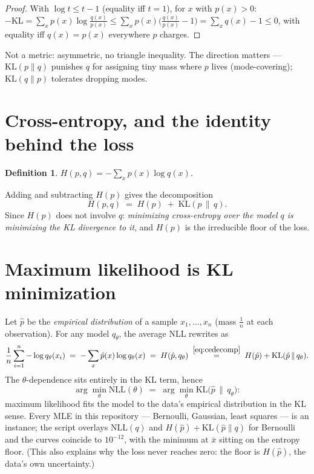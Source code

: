 \documentclass[11pt]{article}
\newtheorem{definition}{Definition}
\begin{document}
\begin{proof}
With $\log t \le t - 1$ (equality iff $t=1$), for $x$ with $p(x)>0$:
$-\mathrm{KL} = \sum_x p(x)\log\frac{q(x)}{p(x)} \le
\sum_x p(x)\bigl(\frac{q(x)}{p(x)} - 1\bigr) = \sum_x q(x) - 1 \le 0$,
with equality iff $q(x)=p(x)$ everywhere $p$ charges.
\end{proof}

Not a metric: asymmetric, no triangle inequality. The direction matters
--- $\mathrm{KL}(p\|q)$ punishes $q$ for assigning tiny mass where $p$
lives (mode-covering); $\mathrm{KL}(q\|p)$ tolerates dropping modes.

\section{Cross-entropy, and the identity behind the loss}

\begin{definition}
$H(p, q) = -\sum_x p(x)\log q(x)$.
\end{definition}

Adding and subtracting $H(p)$ gives the decomposition
\begin{equation}
  \boxed{\;H(p, q) \;=\; H(p) \;+\; \mathrm{KL}(p\,\|\,q).\;}
  \label{eq:cedecomp}
\end{equation}
Since $H(p)$ does not involve $q$: \emph{minimizing cross-entropy over the
model $q$ is minimizing the KL divergence to it}, and $H(p)$ is the
irreducible floor of the loss.

\section{Maximum likelihood is KL minimization}

Let $\hat p$ be the \emph{empirical distribution} of a sample
$x_1,\dots,x_n$ (mass $\tfrac1n$ at each observation). For any model
$q_\theta$, the average NLL rewrites as
\begin{equation}
  \frac1n \sum_{i=1}^n -\log q_\theta(x_i)
  \;=\; -\sum_x \hat p(x) \log q_\theta(x)
  \;=\; H(\hat p, q_\theta)
  \;\overset{\eqref{eq:cedecomp}}{=}\;
  H(\hat p) + \mathrm{KL}(\hat p \,\|\, q_\theta) .
  \label{eq:mlekl}
\end{equation}
The $\theta$-dependence sits entirely in the KL term, hence
\begin{equation}
  \boxed{\;\arg\min_\theta \mathrm{NLL}(\theta)
  \;=\; \arg\min_\theta \mathrm{KL}\bigl(\hat p \,\|\, q_\theta\bigr):\;}
  \label{eq:mleiskl}
\end{equation}
maximum likelihood fits the model to the data's empirical distribution in
the KL sense. Every MLE in this repository --- Bernoulli, Gaussian, least
squares --- is an instance; the script overlays $\mathrm{NLL}(q)$ and
$H(\hat p) + \mathrm{KL}(\hat p\|q)$ for Bernoulli and the curves
coincide to $10^{-12}$, with the minimum at $\bar x$ sitting on the
entropy floor. (This also explains why the loss never reaches zero: the
floor is $H(\hat p)$, the data's own uncertainty.)
\end{document}
